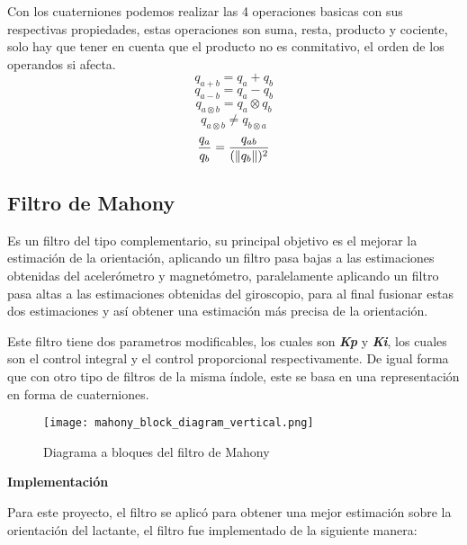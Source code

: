        Con los cuaterniones podemos realizar las 4 operaciones basicas con sus respectivas propiedades, estas operaciones son
        suma, resta, producto y cociente, solo hay que tener en cuenta que el producto no es conmitativo, el orden de los operandos
        si afecta.
        $$  q_{a+b} = q_a + q_b $$
        $$  q_{a-b} = q_a - q_b $$
        $$  q_{a \otimes b} = q_a \otimes q_b $$
        $$  q_{a \otimes b} \neq q_{b \otimes a}  $$
        $$  \frac{q_a}{q_b} = \frac{q_{ab}}{(\lVert q_b\rVert)^2} $$

    \subsection{Filtro de Mahony}
    Es un filtro del tipo complementario, su principal objetivo es el mejorar la estimación de la orientación, aplicando un filtro pasa bajas a las estimaciones obtenidas del acelerómetro y magnetómetro, paralelamente aplicando un filtro pasa altas a las estimaciones obtenidas del giroscopio, para al final fusionar estas dos estimaciones y así obtener una estimación más precisa de la orientación. 
    
    Este filtro tiene dos parametros modificables, los cuales son \textbf{\textit{Kp}} y \textbf{\textit{Ki}}, los cuales son el control integral y el control proporcional respectivamente. De igual forma que con otro tipo de filtros de la misma índole, este se basa en una representación en forma de cuaterniones.
    \begin{figure}[htp]
        \centering
             \texttt{[image: mahony\_block\_diagram\_vertical.png]}
              \caption{Diagrama a bloques del filtro de Mahony}
    \end{figure}
    \FloatBarrier 


    \textbf{Implementación}

    Para este proyecto, el filtro se aplicó para obtener una mejor estimación sobre la orientación del lactante, el filtro fue implementado de la siguiente manera:

